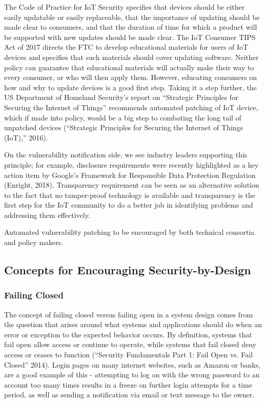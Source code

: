  The Code of Practice for IoT Security specifies that devices should be either easily updatable or easily replaceable, that the importance of updating should be made clear to consumers, and that the duration of time for which a product will be supported with new updates should be made clear. The IoT Consumer TIPS Act of 2017 directs the FTC to develop educational materials for users of IoT devices and specifies that such materials should cover updating software. Neither policy can guarantee that educational materials will actually make their way to every consumer, or who will then apply them. However, educating consumers on how and why to update devices is a good first step. Taking it a step further, the US Department of Homeland Security’s report on “Strategic Principles for Securing the Internet of Things” recommends automated patching of IoT device, which if made into policy, would be a big step to combating the long tail of unpatched devices (“Strategic Principles for Securing the Internet of Things (IoT),” 2016).

On the vulnerability notification side, we see industry leaders supporting this principle; for example, disclosure requirements were recently highlighted as a key action item by Google’s Framework for Responsible Data Protection Regulation (Enright, 2018). Transparency requirement can be seen as an alternative solution to the fact that no tamper-proof technology is available and transparency is the first step for the IoT community to do a better job in identifying problems and addressing them effectively.

Automated vulnerability patching to be encouraged by both technical consortia and policy makers.

\subsection{Concepts for Encouraging Security-by-Design}

\subsubsection{Failing Closed}

The concept of failing closed versus failing open in a system design comes from the question that arises around what systems and applications should do when an error or exception to the expected behavior occurs. By definition, systems that fail open allow access or continue to operate, while systems that fail closed deny access or ceases to function (“Security Fundamentals Part 1: Fail Open vs. Fail Closed” 2014). Login pages on many internet websites, such as Amazon or banks, are a good example of this - attempting to log on with the wrong password to an account too many times results in a freeze on further login attempts for a time period, as well as sending a notification via email or text message to the owner.

